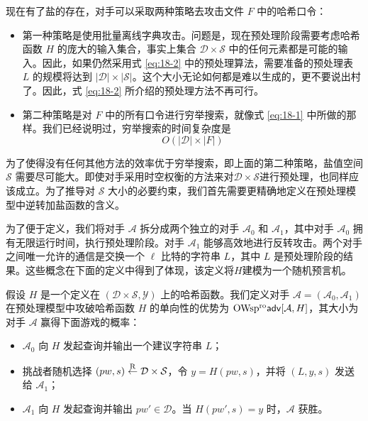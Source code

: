 现在有了盐的存在，对手可以采取两种策略去攻击文件 $F$ 中的哈希口令：

\begin{itemize}
	\item 第一种策略是使用批量离线字典攻击。问题是，现在预处理阶段需要考虑哈希函数 $H$ 的庞大的输入集合，事实上集合 $\mathcal{D}\times\mathcal{S}$ 中的任何元素都是可能的输入。因此，如果仍然采用式 \ref{eq:18-2} 中的预处理算法，需要准备的预处理表 $L$ 的规模将达到 $|\mathcal{D}|\times|\mathcal{S}|$。这个大小无论如何都是难以生成的，更不要说出村了。因此，式 \ref{eq:18-2} 所介绍的预处理方法不再可行。
	\item 第二种策略是对 $F$ 中的所有口令进行穷举搜索，就像式 \ref{eq:18-1} 中所做的那样。我们已经说明过，穷举搜索的时间复杂度是
	\[
	O(|\mathcal{D}|\times |F|)
	\]
\end{itemize}

为了使得没有任何其他方法的效率优于穷举搜索，即上面的第二种策略，盐值空间 $\mathcal{S}$ 需要尽可能大。即使对手采用时空权衡的方法来对$\mathcal{D}\times\mathcal{S}$进行预处理，也同样应该成立。为了推导对 $\mathcal{S}$ 大小的必要约束，我们首先需要更精确地定义在预处理模型中逆转加盐函数的含义。

\begin{snote}[带有预处理的加盐单向函数.]
为了便于定义，我们将对手 $\mathcal{A}$ 拆分成两个独立的对手 $\mathcal{A}_0$ 和 $\mathcal{A}_1$，其中对手 $\mathcal{A}_0$ 拥有无限运行时间，执行预处理阶段。对手 $\mathcal{A}_1$ 能够高效地进行反转攻击。两个对手之间唯一允许的通信是交换一个 $\ell$ 比特的字符串 $L$，其中 $L$ 是预处理阶段的结果。这些概念在下面的定义中得到了体现，该定义将$H$建模为一个随机预言机。
\end{snote}

\begin{definition}\label{def:18-3}
	假设 $H$ 是一个定义在 $(\mathcal{D}\times\mathcal{S},\mathcal{Y})$ 上的哈希函数。我们定义对手 $\mathcal{A}=(\mathcal{A}_0,\mathcal{A}_1)$ 在预处理模型中攻破哈希函数 $H$ 的单向性的优势为 ${\rm OWsp^{ro}\mathsf{adv}}[\mathcal{A},H]$，其大小为对手 $\mathcal{A}$ 赢得下面游戏的概率：
	\begin{itemize}
		\item $\mathcal{A}_0$ 向 $H$ 发起查询并输出一个建议字符串 $L$；
		\item 挑战者随机选择 $(pw,s)\overset{\rm R}\leftarrow\mathcal{D}\times\mathcal{S}$，令 $y=H(pw,s)$，并将 $(L,y,s)$ 发送给 $\mathcal{A}_1$；
		\item $\mathcal{A}_1$ 向 $H$ 发起查询并输出 $pw'\in\mathcal{D}$。当 $H(pw',s)=y$ 时，$\mathcal{A}$ 获胜。
	\end{itemize}
\end{definition}

